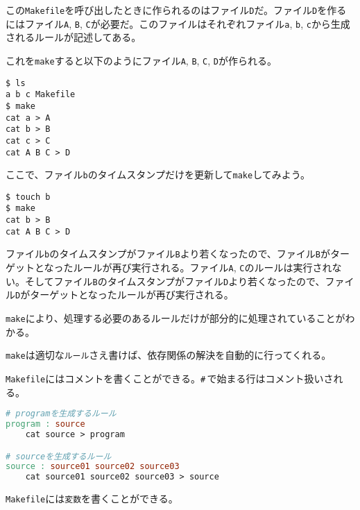 この\texttt{Makefile}を呼び出したときに作られるのはファイル\texttt{D}だ。ファイル\texttt{D}を作るにはファイル\texttt{A}, \texttt{B}, \texttt{C}が必要だ。このファイルはそれぞれファイル\texttt{a}, \texttt{b}, \texttt{c}から生成されるルールが記述してある。

これを\texttt{make}すると以下のようにファイル\texttt{A}, \texttt{B}, \texttt{C}, \texttt{D}が作られる。

\ifTombow\pagebreak\fi
\begin{lstlisting}[style=terminal]
$ ls
a b c Makefile
$ make
cat a > A
cat b > B
cat c > C
cat A B C > D
\end{lstlisting}

ここで、ファイル\texttt{b}のタイムスタンプだけを更新して\texttt{make}してみよう。

\begin{lstlisting}[style=terminal]
$ touch b
$ make
cat b > B
cat A B C > D
\end{lstlisting}

ファイル\texttt{b}のタイムスタンプがファイル\texttt{B}より若くなったので、ファイル\texttt{B}がターゲットとなったルールが再び実行される。ファイル\texttt{A}, \texttt{C}のルールは実行されない。そしてファイル\texttt{B}のタイムスタンプがファイル\texttt{D}より若くなったので、ファイル\texttt{D}がターゲットとなったルールが再び実行される。

\texttt{make}により、処理する必要のあるルールだけが部分的に処理されていることがわかる。

\texttt{make}は適切な\texttt{ルール}さえ書けば、依存関係の解決を自動的に行ってくれる。


\texttt{Makefile}にはコメントを書くことができる。\texttt{\#}\,で始まる行はコメント扱いされる。

\begin{lstlisting}[language=make]
# programを生成するルール
program : source
    cat source > program

# sourceを生成するルール
source : source01 source02 source03
    cat source01 source02 source03 > source
\end{lstlisting}


\texttt{Makefile}には\texttt{変数}を書くことができる。

